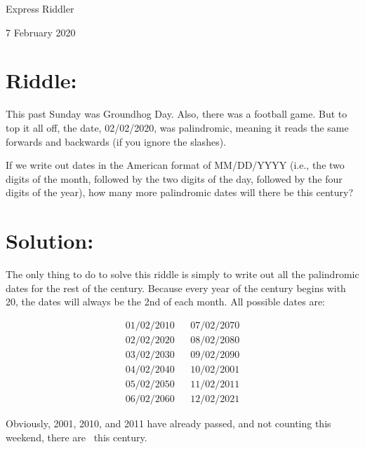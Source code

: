 \documentclass{article}
\begin{document}
\pagestyle{empty} %

\begin{center}
{\LARGE Express Riddler}

\vspace{0.15in}

{\Large 7 February 2020}
\end{center}


\section*{Riddle:}

This past Sunday was Groundhog Day.
Also, there was a football game.
But to top it all off, the date, 02/02/2020, was palindromic, meaning it reads the same forwards and backwards (if you ignore the slashes).

If we write out dates in the American format of MM/DD/YYYY (i.e., the two digits of the month, followed by the two digits of the day, followed by the four digits of the year), how many more palindromic dates will there be this century?

\section*{Solution:}

The only thing to do to solve this riddle is simply to write out all the palindromic dates for the rest of the century.
Because every year of the century begins with 20, the dates will always be the 2nd of each month.
All possible dates are:

\begin{align*}
01/02/2010& &07/02/2070 \\
02/02/2020& &08/02/2080 \\
03/02/2030& &09/02/2090 \\
04/02/2040& &10/02/2001 \\
05/02/2050& &11/02/2011 \\
06/02/2060& &12/02/2021
\end{align*}

Obviously, 2001, 2010, and 2011 have already passed, and not counting this weekend, there are
\, this century.
\end{document}
